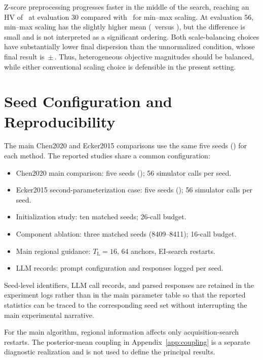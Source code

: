 Z-score preprocessing progresses faster in the middle of the search, reaching
an HV of \NormMidZScore\ at evaluation 30 compared with \NormMidMinMax\ for
min--max scaling.
At evaluation 56, min--max scaling has the slightly higher mean
(\NormMinMaxMean\ versus \NormZScoreMean), but the difference is small and is
not interpreted as a significant ordering.
Both scale-balancing choices have substantially lower final dispersion than
the unnormalized condition, whose final result is
\NormNoneMean\,$\pm$\,\NormNoneStd.
Thus, heterogeneous objective magnitudes should be balanced, while either
conventional scaling choice is defensible in the present setting.


\section{Seed Configuration and Reproducibility}
\label{app:reproducibility}

The main Chen2020 and Ecker2015 comparisons use the same five seeds
(\MainSeedSet) for each method.
The reported studies share a common configuration:

\begin{itemize}
\item Chen2020 main comparison: five seeds (\MainSeedSet);
56 simulator calls per seed.
\item Ecker2015 second-parameterization case: five seeds
(\MainSeedSet); 56 simulator calls per seed.
\item Initialization study: ten matched seeds; 26-call budget.
\item Component ablation: three matched seeds (8409--8411);
16-call budget.
\item Main regional guidance: $T_{\mathrm L}=16$, 64 anchors,
EI-search restarts.
\item LLM records: prompt configuration and responses logged per
seed.
\end{itemize}

Seed-level identifiers, LLM call records, and parsed responses are
retained in the experiment logs rather than in the main parameter
table so that the reported statistics can be traced to the
corresponding seed set without interrupting the main experimental
narrative.

For the main algorithm, regional information affects only
acquisition-search restarts. The posterior-mean coupling in
Appendix~\ref{app:coupling} is a separate diagnostic realization and
is not used to define the principal results.
